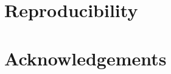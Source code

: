 \documentclass[11pt,a4paper]{article}
\theoremstyle{reproduction}
\begin{document}
\section{Reproducibility}
\label{sec:repro}



\clearpage
\section*{Acknowledgements}



\clearpage
\printbibliography
\end{document}

